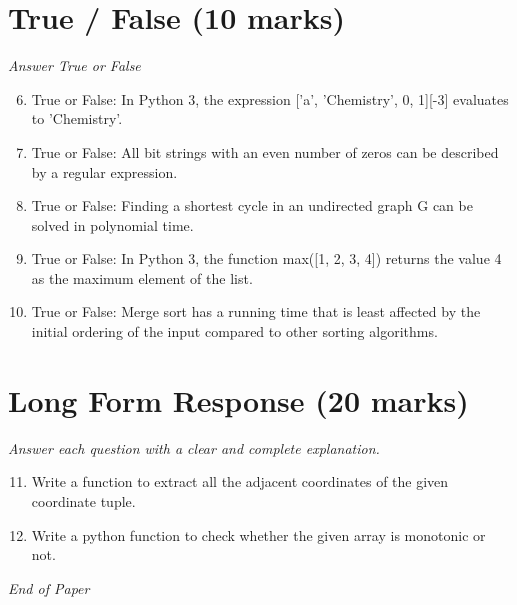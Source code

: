 \documentclass[12pt]{article}
\begin{document}
\section*{True / False (10 marks)}
\textit{Answer True or False}
\begin{enumerate}[label=\arabic*.]
\setcounter{enumi}{5}
\item True or False: In Python 3, the expression ['a', 'Chemistry', 0, 1][-3] evaluates to 'Chemistry'.
\item True or False: All bit strings with an even number of zeros can be described by a regular expression.
\item True or False: Finding a shortest cycle in an undirected graph G can be solved in polynomial time.
\item True or False: In Python 3, the function max([1, 2, 3, 4]) returns the value 4 as the maximum element of the list.
\item True or False: Merge sort has a running time that is least affected by the initial ordering of the input compared to other sorting algorithms.
\end{enumerate}

\section*{Long Form Response (20 marks)}
\textit{Answer each question with a clear and complete explanation.}
\begin{enumerate}[label=\arabic*.]
\setcounter{enumi}{10}
\item Write a function to extract all the adjacent coordinates of the given coordinate tuple.
\item Write a python function to check whether the given array is monotonic or not.
\end{enumerate}

\vfill
\noindent\textit{End of Paper}
\end{document}
